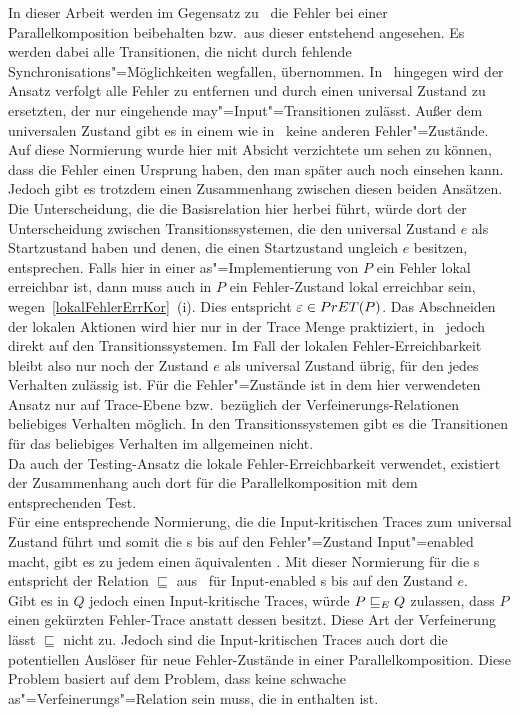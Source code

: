 In dieser Arbeit werden im Gegensatz zu~\cite{Vogler2016MIA3} die Fehler bei
einer Parallelkomposition beibehalten bzw.\ aus dieser entstehend angesehen. Es
werden dabei alle Transitionen, die nicht durch fehlende
Synchronisations"=Möglichkeiten wegfallen, übernommen. In~\cite{Vogler2016MIA3}
hingegen wird der Ansatz verfolgt alle Fehler zu entfernen und durch einen
universal Zustand zu ersetzten, der nur eingehende may"=Input"=Transitionen
zulässt. Außer dem universalen Zustand gibt es in einem \MIA wie
in~\cite{Vogler2016MIA3} keine anderen Fehler"=Zustände. Auf diese Normierung
wurde hier mit Absicht verzichtete um sehen zu können, dass die Fehler einen
Ursprung haben, den man später auch noch einsehen kann. Jedoch gibt es trotzdem
einen Zusammenhang zwischen diesen beiden Ansätzen.\\
Die Unterscheidung, die die Basisrelation \EBRel{} hier herbei führt, würde
dort der Unterscheidung zwischen Transitionssystemen, die den universal
Zustand $e$ als Startzustand haben und denen, die einen Startzustand ungleich
$e$ besitzen, entsprechen. Falls hier in einer as"=Implementierung von $P$ ein
Fehler lokal erreichbar ist, dann muss auch in $P$ ein Fehler-Zustand lokal
erreichbar sein, wegen~\ref{lokalFehlerErrKor}~(i). Dies entspricht
$\varepsilon \in PrET (P)$. Das Abschneiden der lokalen Aktionen wird hier nur
in der Trace Menge praktiziert, in~\cite{Vogler2016MIA3} jedoch direkt auf den
Transitionssystemen. Im Fall der lokalen Fehler-Erreichbarkeit bleibt also
nur noch der Zustand $e$ als universal Zustand übrig, für den jedes Verhalten
zulässig ist. Für die Fehler"=Zustände ist in dem hier verwendeten Ansatz nur
auf Trace-Ebene bzw.\ bezüglich der Verfeinerungs-Relationen beliebiges
Verhalten möglich. In den Transitionssystemen gibt es die Transitionen für das
beliebiges Verhalten im allgemeinen nicht.\\
Da auch der Testing-Ansatz die lokale Fehler-Erreichbarkeit verwendet,
existiert der Zusammenhang auch dort für die Parallelkomposition mit dem
entsprechenden Test.\\
Für eine entsprechende Normierung, die die Input-kritischen Traces zum
universal Zustand führt und somit die \MEIO{}s bis auf den Fehler"=Zustand
Input"=enabled macht, gibt es zu jedem \MEIO{} einen äquivalenten \MIA{}. Mit
dieser Normierung für die \MEIO{}s entspricht \ERel{} der Relation
$\sqsubseteq$ aus~\cite{Vogler2016MIA3} für Input-enabled \MIA{}s bis auf den
Zustand $e$.\\
Gibt es in $Q$ jedoch einen Input-kritische Traces, würde $P  \sqsubseteq  _E Q$ zulassen,
dass $P$ einen gekürzten Fehler-Trace anstatt dessen besitzt. Diese Art der
Verfeinerung lässt $\sqsubseteq$ nicht zu. Jedoch sind die Input-kritischen
Traces auch dort die potentiellen Auslöser für neue Fehler-Zustände in einer
Parallelkomposition. Diese Problem basiert auf dem Problem, dass \ERel{} keine
schwache as"=Verfeinerungs"=Relation sein muss, die in \wasRel{} enthalten ist.

